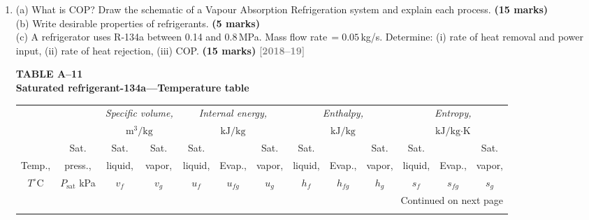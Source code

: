 \documentclass[12pt,a3paper]{article}
\newcommand{\yr}[1]{\hfill\textcolor{gray}{\small\textbf{[#1]}}}
\newcommand{\mk}[1]{\textcolor{orange!70!black}{\small\textbf{(#1 marks)}}}
\begin{document}
\begin{enumerate}
\item \label{qlabel:A3-Q16}
(a) What is COP? Draw the schematic of a Vapour Absorption Refrigeration system and explain each process. \mk{15}\\
(b) Write desirable properties of refrigerants. \mk{5}\\
(c) A refrigerator uses R-134a between 0.14 and 0.8\,MPa. Mass flow rate\,$= 0.05$\,kg/s. Determine: (i) rate of heat removal and power input, (ii) rate of heat rejection, (iii) COP. \mk{15}
\yr{2018--19}

\noindent\textbf{\Large TABLE A--11} \\
\noindent\textbf{\large Saturated refrigerant-134a---Temperature table}
\vspace{0.3cm}

\begin{center}
\small
\begin{longtable}{c c c c c c c c c c c c c}
\toprule\toprule
& & \multicolumn{2}{c}{\textit{Specific volume,}} & \multicolumn{3}{c}{\textit{Internal energy,}} & \multicolumn{3}{c}{\textit{Enthalpy,}} & \multicolumn{3}{c}{\textit{Entropy,}} \\
& & \multicolumn{2}{c}{$\text{m}^3\text{/kg}$} & \multicolumn{3}{c}{$\text{kJ/kg}$} & \multicolumn{3}{c}{$\text{kJ/kg}$} & \multicolumn{3}{c}{$\text{kJ/kg}\cdot\text{K}$} \\
\cmidrule(lr){3-4} \cmidrule(lr){5-7} \cmidrule(lr){8-10} \cmidrule(lr){11-13}
& Sat. & Sat. & Sat. & Sat. & & Sat. & Sat. & & Sat. & Sat. & & Sat. \\
Temp., & press., & liquid, & vapor, & liquid, & Evap., & vapor, & liquid, & Evap., & vapor, & liquid, & Evap., & vapor, \\
$T^\circ\text{C}$ & $P_{\text{sat}}$ kPa & $v_f$ & $v_g$ & $u_f$ & $u_{fg}$ & $u_g$ & $h_f$ & $h_{fg}$ & $h_g$ & $s_f$ & $s_{fg}$ & $s_g$ \\
\midrule
\endhead

\midrule
\multicolumn{13}{r}{{Continued on next page}} \\
\bottomrule
\endfoot

\bottomrule\bottomrule
\endlastfoot


\end{longtable}
\end{center}
\end{enumerate}
\end{document}
